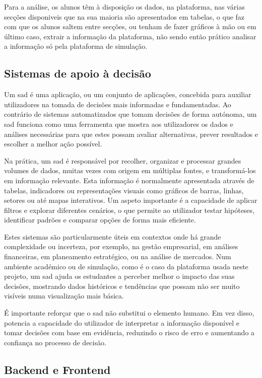 Para a análise, os alunos têm à disposição os dados, na plataforma, nas várias secções disponiveis que na sua maioria são apresentados em tabelas, o que faz com que os alunos saltem entre secções, ou tenham de fazer gráficos à mão ou em último caso, extrair a informação da plataforma, não sendo então prático analisar a informação só pela plataforma de simulação.

\subsection{Sistemas de apoio à decisão}
\label{sec:sad}

Um \gls{sad} é uma aplicação, ou um conjunto de aplicações, concebida para auxiliar utilizadores na tomada de decisões mais informadas e fundamentadas. Ao contrário de sistemas automatizados que tomam decisões de forma autónoma, um \gls{sad} funciona como uma ferramenta que mostra aos utilizadores os dados e análises necessárias para que estes possam avaliar alternativas, prever resultados e escolher a melhor ação possível.

Na prática, um \gls{sad} é responsável por recolher, organizar e processar grandes volumes de dados, muitas vezes com origem em múltiplas fontes, e transformá-los em informação relevante. Esta informação é normalmente apresentada através de tabelas, indicadores ou representações visuais como gráficos de barras, linhas, setores ou até mapas interativos. Um aspeto importante é a capacidade de aplicar filtros e explorar diferentes cenários, o que permite ao utilizador testar hipóteses, identificar padrões e comparar opções de forma mais eficiente.

Estes sistemas são particularmente úteis em contextos onde há grande complexidade ou incerteza, por exemplo, na gestão empresarial, em análises financeiras, em planeamento estratégico, ou na análise de mercados. Num ambiente académico ou de simulação, como é o caso da plataforma usada neste projeto, um \gls{sad} ajuda os estudantes a perceber melhor o impacto das suas decisões, mostrando dados históricos e tendências que possam não ser muito visíveis numa visualização mais básica.

É importante reforçar que o \gls{sad} não substitui o elemento humano. Em vez disso, potencia a capacidade do utilizador de interpretar a informação disponível e tomar decisões com base em evidência, reduzindo o risco de erro e aumentando a confiança no processo de decisão.

\subsection{Backend e Frontend}

